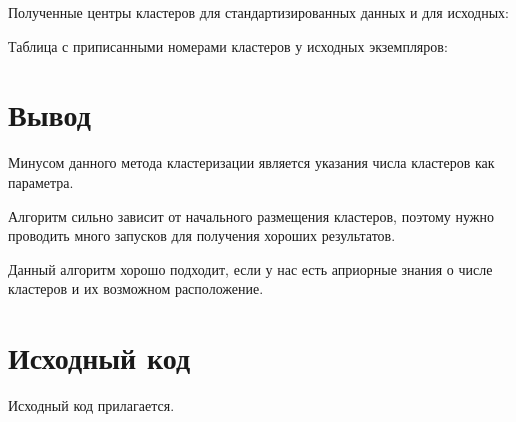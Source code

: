 \documentclass{article} %
\begin{document}
Полученные центры кластеров
для стандартизированных данных
и для исходных:



\clearpage
Таблица с приписанными номерами кластеров
у исходных экземпляров:



\section*{Вывод}
Минусом данного метода кластеризации
является указания числа кластеров как параметра.

Алгоритм сильно зависит от начального
размещения кластеров,
поэтому нужно проводить много запусков
для получения хороших результатов.

Данный алгоритм хорошо подходит,
если у нас есть априорные знания
о числе кластеров и
их возможном расположение.

\section*{Исходный код}
Исходный код прилагается.
\end{document}
